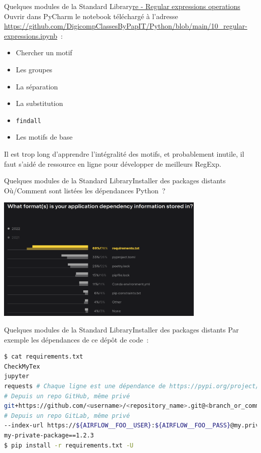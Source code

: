 \documentclass{beamer}
\begin{document}
    \begin{frame}{Quelques modules de la Standard Library}{\href{https://docs.python.org/fr/3/library/re.html}{re - Regular expressions operations}}
        \bigbreak
        Ouvrir dans PyCharm le notebook téléchargé à l'adresse \url{https://github.com/DigicompClassesByPapIT/Python/blob/main/10_regular-expressions.ipynb}~:
        \begin{itemize}
            \item Chercher un motif
            \item Les groupes
            \item La séparation
            \item La substitution
            \item \lstinline{findall}
            \item Les motifs de base
        \end{itemize}
        \begin{dangercolorbox}
            Il est trop long d'apprendre l'intégralité des motifs, et probablement inutile, il faut s'aidé de ressource en ligne pour développer de meilleurs RegExp.
        \end{dangercolorbox}
    \end{frame}


    \begin{frame}{Quelques modules de la Standard Library}{Installer des packages distants}
        Où/Comment sont listées les dépendances Python~?
        \begin{center}
            \includegraphics[width=10cm]{image/survey_dependency_listing}
        \end{center}
    \end{frame}


    \begin{frame}[fragile]{Quelques modules de la Standard Library}{Installer des packages distants}
        Par exemple les dépendances de ce dépôt de code~:
        \begin{lstlisting}[language=Bash]
$ cat requirements.txt
CheckMyTex
jupyter
requests # Chaque ligne est une dépendance de https://pypi.org/project/requests/
# Depuis un repo GitHub, même privé
git+https://github.com/<username>/<repository_name>.git@<branch_or_commit(optional)>#egg=<package_name>
# Depuis un repo GitLab, même privé
--index-url https://${AIRFLOW__FOO__USER}:${AIRFLOW__FOO__PASS}@my.privatepypi.com
my-private-package==1.2.3
$ pip install -r requirements.txt -U
        \end{lstlisting}
    \end{frame}
\end{document}

